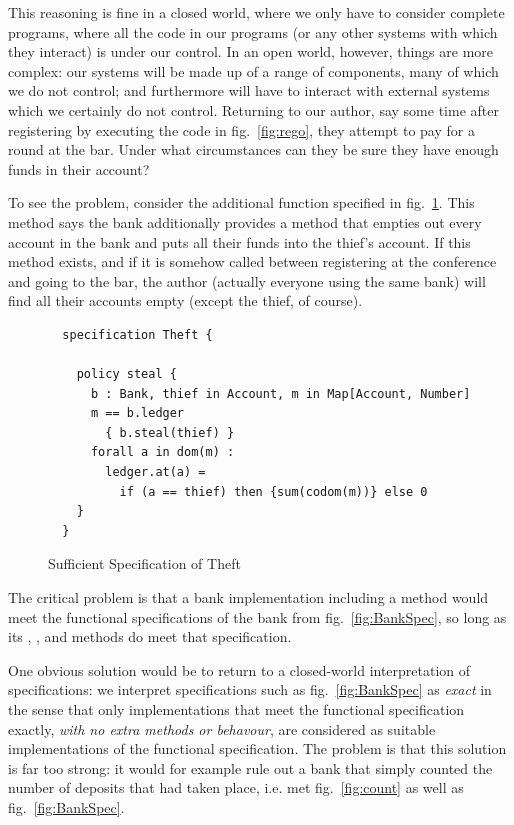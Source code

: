 This reasoning is fine in a closed world, where we only have to
consider complete programs, where all the code in our programs (or any
other systems with which they interact) is under our control.   In an
open world, however, things are more complex: our systems will be made
up of a range of components, many of which we do not control; and
furthermore will have to interact with external systems which we
certainly do not control.  Returning to our author, say some time
after registering by executing the code in fig.~\ref{fig:rego}, they
attempt to pay for a round at the bar.  Under what circumstances can
they be sure they have enough funds in their account?

To see the problem, consider the additional function specified in
fig.~\ref{fig:steal}. This method says the bank additionally provides a
 method that empties out every account in the bank and puts
all their funds into the thief's account. If this method exists, and
if it is somehow called between registering at the conference and
going to the bar, the author (actually everyone using the same bank)
will find all their accounts empty (except the thief, of course).

\begin{figure}[tbp]
\begin{lstlisting}
  specification Theft {

    policy steal {
      b : Bank, thief in Account, m in Map[Account, Number]
      m == b.ledger
        { b.steal(thief) }
      forall a in dom(m) :
        ledger.at(a) =
          if (a == thief) then {sum(codom(m))} else 0
    }
  }
\end{lstlisting}
\caption{Sufficient Specification of Theft}
\label{fig:steal}
\end{figure}

The critical problem is that a bank implementation including a 
method would meet the functional specifications of the bank from
fig.~\ref{fig:BankSpec}, so long as its ,
, and  methods do meet
that specification.

One obvious solution would be to return to a closed-world
interpretation of specifications: we interpret specifications such as
fig.~\ref{fig:BankSpec} as \emph{exact} in the sense that only
implementations that meet the functional specification exactly,
\emph{with no extra methods or behavour}, are considered as suitable
implementations of the functional specification. The problem is that
this solution is far too strong: it would for example rule out a bank
that simply counted the number of deposits that had taken place,
i.e. met fig.~\ref{fig:count} as well as fig.~\ref{fig:BankSpec}.

